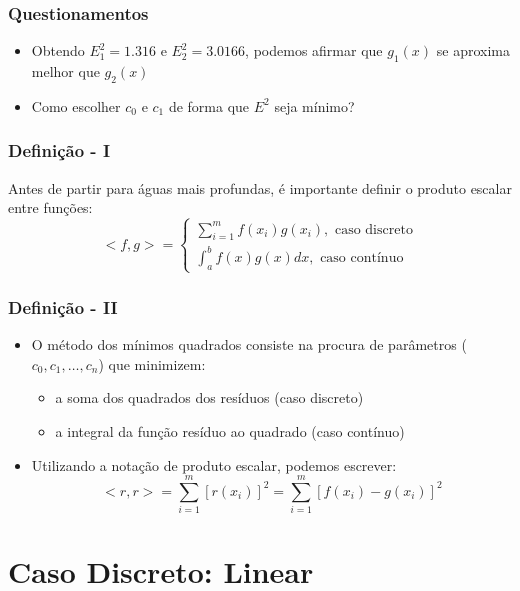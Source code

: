 \documentclass{beamer}
\theoremstyle{mystyle}
\begin{document}
	\begin{frame}
		\frametitle{Questionamentos}
		\begin{itemize}
			\item  Obtendo $ E^{2}_{1} = 1.316 $ e $ E^{2}_{2} = 3.0166 $, podemos afirmar que $ g_{1}(x) $ se aproxima melhor que $ g_{2}(x) $ 
			\item  Como escolher $ c_{0} $ e $ c_{1} $ de forma que $ E^{2} $ seja mínimo?		
		\end{itemize}
	\end{frame}
	
	\begin{frame}
		\frametitle{Definição - I}
		Antes de partir para águas mais profundas, é importante definir o produto escalar entre funções:
		\begin{equation*}
			<f,g> = \left\lbrace \begin{array}{l}
					\sum_{i=1}^{m} f(x_{i})g(x_{i}), \mbox{ caso discreto} \\
					\int_{a}^{b} f(x)g(x)dx, \mbox{ caso contínuo}
				\end{array} \right. 
		\end{equation*}
	\end{frame}

	\begin{frame}
		\frametitle{Definição - II}
		\begin{itemize}
			\item O método dos mínimos quadrados consiste na procura de	parâmetros ($ c_{0},c_{1},\ldots,c_{n}  $) que minimizem:
			\begin{itemize}
				\item a soma dos quadrados dos resíduos (caso discreto)
				\item a integral da função resíduo ao quadrado (caso contínuo)
			\end{itemize}
		\item Utilizando a notação de produto escalar, podemos escrever:
		\begin{equation*}
			<r,r> = \sum_{i=1}^{m} [r(x_{i})]^{2} = \sum_{i=1}^{m} [f(x_{i}) - g(x_{i})]^{2}
		\end{equation*}
		\end{itemize}
	\end{frame}

\section{Caso Discreto: Linear}
\end{document}
